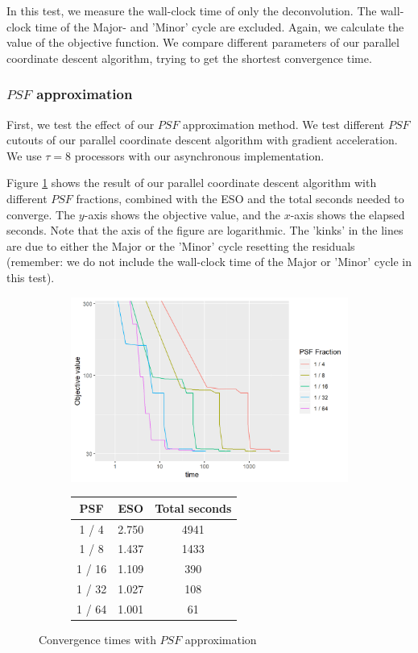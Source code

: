 In this test, we measure the wall-clock time of only the deconvolution. The wall-clock time of the Major- and 'Minor' cycle are excluded. Again, we calculate the value of the objective function. We compare different parameters of our parallel coordinate descent algorithm, trying to get the shortest convergence time.

\subsubsection{$PSF$ approximation}
First, we test the effect of our $PSF$ approximation method. We test different $PSF$ cutouts of our parallel coordinate descent algorithm with gradient acceleration. We use $\tau = 8$ processors with our asynchronous implementation.

Figure \ref{pcdm:results:psf} shows the result of our parallel coordinate descent algorithm with different $PSF$ fractions, combined with the ESO and the total seconds needed to converge. The $y$-axis shows the objective value, and the $x$-axis shows the elapsed seconds. Note that the axis of the figure are logarithmic. The 'kinks' in the lines are due to either the Major or the 'Minor' cycle resetting the residuals (remember: we do not include the wall-clock time of the Major or 'Minor' cycle in this test).

\begin{figure}[h]
	\centering
	\begin{subfigure}{0.6\linewidth}
		\includegraphics[width=1.0\linewidth]{./chapters/05.pcdm/parameters/psfSize.png}
	\end{subfigure}
	\begin{subfigure}{0.35\linewidth}
		\begin{tabular}{c | c | c}
			PSF & ESO & Total seconds \\ \hline
			1 / 4 & 2.750 & 4941 \\
			1 / 8 & 1.437 & 1433 \\
			1 / 16 & 1.109 & 390 \\
			1 / 32 & 1.027 & 108 \\
			1 / 64 & 1.001 & 61 \\
		\end{tabular}
	\end{subfigure}
	\caption{Convergence times with $PSF$ approximation}
	\label{pcdm:results:psf}
\end{figure}

